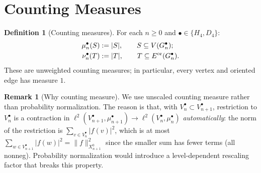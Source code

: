 \documentclass[11pt, a4paper]{amsart}
\theoremstyle{definition}
\newtheorem{definition}[theorem]{Definition}
\newtheorem{remark}[theorem]{Remark}
\begin{document}
\section{Counting Measures}
\label{sec:measures}

\begin{definition}[Counting measures]
\label{def:counting-measures}
For each $n \geq 0$ and $\bullet \in \{H_4, D_4\}$:
\begin{align*}
  \mu_n^\bullet(S) &:= |S|, \qquad S \subseteq V(G_n^\bullet); \\
  \nu_n^\bullet(T) &:= |T|, \qquad T \subseteq E^{\rm or}(G_n^
    \bullet).
\end{align*}
These are unweighted counting measures; in particular, every vertex
and oriented edge has measure $1$.
\end{definition}

\begin{remark}[Why counting measure]
\label{rmk:why-counting}
We use unscaled counting measure rather than probability
normalization. The reason is that, with $V_n^\bullet \subset
V_{n+1}^\bullet$, restriction to $V_n^\bullet$ is a contraction
in $\ell^2(V_{n+1}^\bullet, \mu_{n+1}^\bullet) \to
\ell^2(V_n^\bullet, \mu_n^\bullet)$ \emph{automatically}: the
norm of the restriction is $\sum_{v \in V_n^\bullet} |f(v)|^2$,
which is at most $\sum_{w \in V_{n+1}^\bullet} |f(w)|^2 =
\|f\|^2_{X_{n+1}^0}$ since the smaller sum has fewer terms (all
nonneg). Probability normalization would introduce a level-dependent
rescaling factor that breaks this property.
\end{remark}
\end{document}

